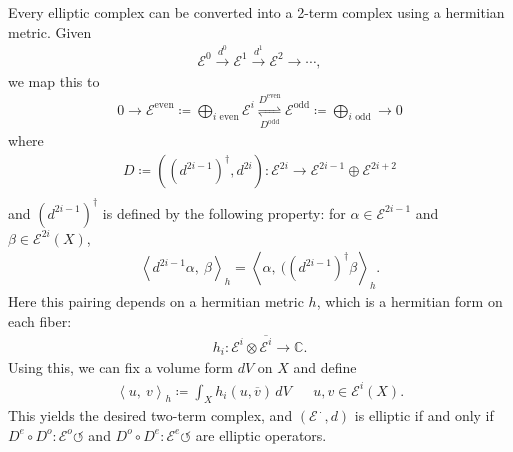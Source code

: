 \begin{remark}

Every elliptic complex can be converted into a 2-term complex using a
hermitian metric. Given
\begin{align*}
\mathcal{E}^0 \xrightarrow{d^0} \mathcal{E}^1 \xrightarrow{d^1} \mathcal{E}^2 \to \cdots
,\end{align*}
we map this to
\begin{align*}
0 \to \mathcal{E}^{\text{even}} \coloneqq\bigoplus_{i \text{ even} } \mathcal{E}^i 
\mathrel{\operatorname*{\rightleftharpoons}_{D^{\text{odd} }}^{D^\text{even}}} 
\mathcal{E}^{\text{odd}} \coloneqq\bigoplus_{i \text{ odd}} \to 0
\end{align*}
where
\begin{align*}
D \coloneqq((d^{2i-1})^{\dagger} , d^{2i} ) : \mathcal{E}^{2i} \to \mathcal{E}^{2i-1} \oplus \mathcal{E}^{2i+2} \\
\end{align*}
and \((d^{2i-1})^{\dagger}\) is defined by the following property: for
\(\alpha\in \mathcal{E}^{2i-1}\) and \(\beta \in \mathcal{E}^{2i}(X)\),
\begin{align*}
{\left\langle { d^{2i-1} \alpha},~{\beta} \right\rangle}_h = {\left\langle { \alpha },~{ ( (d^{2i-1})^{\dagger} \beta} \right\rangle}_h
.\end{align*}
Here this pairing depends on a hermitian metric \(h\), which is a
hermitian form on each fiber:
\begin{align*}
h_i: \mathcal{E}^i \otimes{\overline{{ \mathcal{E}^i}}} \to {\mathbb{C}}
.\end{align*}
Using this, we can fix a volume form \(dV\) on \(X\) and define
\begin{align*}
{\left\langle {u},~{v} \right\rangle}_h \coloneqq\int_X h_i(u, {\overline{{v}}}) \, dV && u, v\in \mathcal{E}^i(X)
.\end{align*}
This yields the desired two-term complex, and
\(( {\mathcal{E}}^{{\,\cdot\,}}, d)\) is elliptic if and only if
\(D^e \circ D^o: \mathcal{E}^o {\circlearrowleft}\) and
\(D^o \circ D^e: \mathcal{E}^e {\circlearrowleft}\) are elliptic
operators.

\end{remark}

